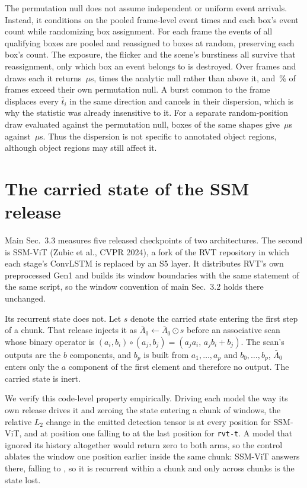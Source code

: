 \documentclass[10pt,twocolumn,letterpaper]{article}
\newcommand{\micro}{\ensuremath{\mu}}
\begin{document}
The permutation null does not assume independent or uniform event arrivals. Instead,
it conditions on the pooled frame-level event times and each box's event count while
randomizing box assignment. For each frame the events of all qualifying boxes are pooled
and reassigned to boxes at random, preserving each box's count. The exposure, the flicker and the scene's burstiness
all survive that reassignment, only which box an event belongs to is destroyed.
Over \permFrames{} frames and \permDraws{} draws each it returns
\permNull\,\micro s, \permRatio{} times the analytic null rather than above it,
and \permAbovePct\,\% of frames exceed their own permutation null. A burst common to the frame
displaces every $\bar{t}_{i}$ in the same direction and cancels in their
dispersion, which is why the statistic was already insensitive to it. For a separate
random-position draw evaluated against the permutation null, boxes of the same shapes give
\permRandObs\,\micro s against \permRandNull\,\micro s. Thus the dispersion is not specific
to annotated object regions, although object regions may still affect it.

\section{The carried state of the SSM release}


Main Sec.~3.3 measures five released checkpoints of two architectures. The second is
SSM-ViT (Zubic et al., CVPR 2024), a fork of the RVT repository in which each stage's
ConvLSTM is
replaced by an S5 layer. It distributes RVT's own preprocessed Gen1 and builds its window
boundaries with the same statement of the same script, so the window convention of main
Sec.~3.2 holds there unchanged.

Its recurrent state does not. Let $s$ denote the carried state entering the first
step of a chunk. That release injects it as
$\bar{\Lambda}_{0}\leftarrow\bar{\Lambda}_{0}\odot s$ before an associative scan whose
binary operator is $(a_{i},b_{i})\circ(a_{j},b_{j})=(a_{j}a_{i},\,a_{j}b_{i}+b_{j})$. The
scan's outputs are the $b$ components, and $b_{p}$ is built from $a_{1},\dots,a_{p}$ and
$b_{0},\dots,b_{p}$, $\bar{\Lambda}_{0}$ enters only the $a$ component of the first element
and therefore no output. The carried state is inert.

We verify this code-level property empirically. Driving each model the way its own release
drives it and zeroing the state entering a chunk of \ssmChunkMeas{} windows, the relative
$L_{2}$ change in the emitted detection tensor is \ssmStateEffect{} at every position for
SSM-ViT, and \rvtStateEffectOne{} at position one falling to \rvtStateEffect{} at the last
position for \texttt{rvt-t}. A model that ignored its history altogether would return zero to
both arms, so the control ablates the window one position earlier inside the same chunk:
SSM-ViT answers \ssmInchunkOne{} there, falling to \ssmInchunkLast{}, so it is recurrent
within a chunk and only across chunks is the state lost.
\end{document}
